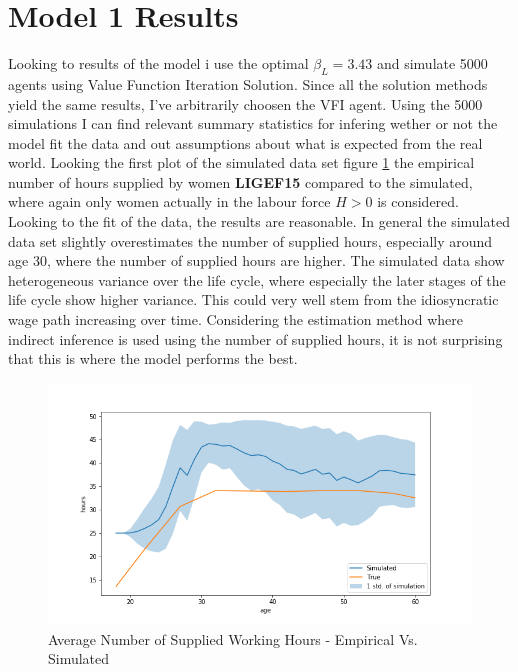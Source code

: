 \section{Model 1 Results}

Looking to results of the model i use the optimal $\beta_L = 3.43$ and simulate 5000 agents using Value Function Iteration Solution. Since all the solution methods yield the same results, I've arbitrarily choosen the VFI agent. Using the 5000 simulations I can find relevant summary statistics for infering wether or not the model fit the data and out assumptions about what is expected from the real world. Looking the  first plot of the simulated data set figure \ref{fig:dqi_model1_average_path_sim_vs_empirical} the empirical number of hours supplied by women \textbf{LIGEF15} compared to the simulated, where again only women actually in the labour force $H>0$ is considered. Looking to the fit of the data, the results are reasonable. In general the simulated data set slightly overestimates the number of supplied hours, especially around age 30, where the number of supplied hours are higher. The simulated data show heterogeneous variance over the life cycle, where especially the later stages of the life cycle show higher variance. This could very well stem from the idiosyncratic wage path increasing over time. Considering the estimation method where indirect inference is used using the number of supplied hours, it is not surprising that this is where the model performs the best. 


\begin{figure}
    \centering
    \includegraphics[scale=0.4]{figures/dqi_model1_estimation_labour_supply.png}
    \caption{Average Number of Supplied Working Hours - Empirical Vs. Simulated}
    \label{fig:dqi_model1_average_path_sim_vs_empirical}
\end{figure}

